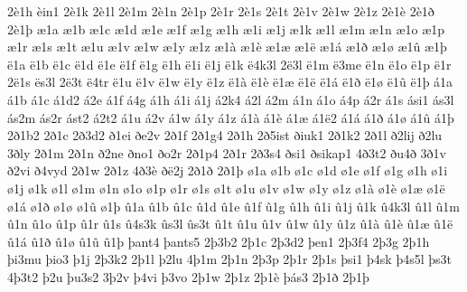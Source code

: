 {2^^e81h
^^e8in1
2^^e81k
2^^e81l
2^^e81m
2^^e81n
2^^e81p
2^^e81r
2^^e81s
2^^e81t
2^^e81v
2^^e81w
2^^e81z
2^^e81^^e8
2^^e81^^f0
2^^e81^^fe
^^e61a
^^e61b
^^e61c
^^e61d
^^e61e
^^e61f
^^e61g
^^e61h
^^e61i
^^e61j
^^e61k
^^e61l
^^e61m
^^e61n
^^e61o
^^e61p
^^e61r
^^e61s
^^e61t
^^e61u
^^e61v
^^e61w
^^e61y
^^e61z
^^e61^^e0
^^e61^^e8
^^e61^^e6
^^e61^^eb
^^e61^^e1
^^e61^^f0
^^e61^^f8
^^e61^^fb
^^e61^^fe
^^eb1a
^^eb1b
^^eb1c
^^eb1d
^^eb1e
^^eb1f
^^eb1g
^^eb1h
^^eb1i
^^eb1j
^^eb1k
^^eb4k3l
2^^eb3l
^^eb1m
^^eb3me
^^eb1n
^^eb1o
^^eb1p
^^eb1r
2^^eb1s
^^ebs3l
2^^eb3t
^^eb4tr
^^eb1u
^^eb1v
^^eb1w
^^eb1y
^^eb1z
^^eb1^^e0
^^eb1^^e8
^^eb1^^e6
^^eb1^^eb
^^eb1^^e1
^^eb1^^f0
^^eb1^^f8
^^eb1^^fb
^^eb1^^fe
^^e11a
^^e11b
^^e11c
^^e11d2
^^e12e
^^e11f
^^e14g
^^e11h
^^e11i
^^e11j
^^e12k4
^^e12l
^^e12m
^^e11n
^^e11o
^^e14p
^^e12r
^^e11s
^^e1si1
^^e1s3l
^^e1s2m
^^e1s2r
^^e1st2
^^e12t2
^^e11u
^^e12v
^^e11w
^^e11y
^^e11z
^^e11^^e0
^^e11^^e8
^^e11^^e6
^^e11^^eb2
^^e11^^e1
^^e11^^f0
^^e11^^f8
^^e11^^fb
^^e11^^fe
2^^f01b2
2^^f01c
2^^f03d2
^^f01ei
^^f0e2v
2^^f01f
2^^f01g4
2^^f01h
2^^f05ist
^^f0iuk1
2^^f01k2
2^^f01l
^^f02lij
^^f02lu
3^^f0ly
2^^f01m
2^^f01n
^^f02ne
^^f0no1
^^f0o2r
2^^f01p4
2^^f01r
2^^f03s4
^^f0si1
^^f0sikap1
4^^f03t2
^^f0u4^^f0
3^^f01v
^^f02vi
^^f04vyd
2^^f01w
2^^f01z
4^^f03^^e8
^^f0^^eb2j
2^^f01^^f0
2^^f01^^fe
^^f81a
^^f81b
^^f81c
^^f81d
^^f81e
^^f81f
^^f81g
^^f81h
^^f81i
^^f81j
^^f81k
^^f81l
^^f81m
^^f81n
^^f81o
^^f81p
^^f81r
^^f81s
^^f81t
^^f81u
^^f81v
^^f81w
^^f81y
^^f81z
^^f81^^e0
^^f81^^e8
^^f81^^e6
^^f81^^eb
^^f81^^e1
^^f81^^f0
^^f81^^f8
^^f81^^fb
^^f81^^fe
^^fb1a
^^fb1b
^^fb1c
^^fb1d
^^fb1e
^^fb1f
^^fb1g
^^fb1h
^^fb1i
^^fb1j
^^fb1k
^^fb4k3l
^^fb1l
^^fb1m
^^fb1n
^^fb1o
^^fb1p
^^fb1r
^^fb1s
^^fb4s3k
^^fbs3l
^^fbs3t
^^fb1t
^^fb1u
^^fb1v
^^fb1w
^^fb1y
^^fb1z
^^fb1^^e0
^^fb1^^e8
^^fb1^^e6
^^fb1^^eb
^^fb1^^e1
^^fb1^^f0
^^fb1^^f8
^^fb1^^fb
^^fb1^^fe
^^feant4
^^feants5
2^^fe3b2
2^^fe1c
2^^fe3d2
^^feen1
2^^fe3f4
2^^fe3g
2^^fe1h
^^fei3mu
^^feio3
^^fe1j
2^^fe3k2
2^^fe1l
^^fe2lu
4^^fe1m
2^^fe1n
2^^fe3p
2^^fe1r
2^^fe1s
^^fesi1
^^fe4sk
^^fe4s5l
^^fes3t
4^^fe3t2
^^fe2u
^^feu3s2
3^^fe2v
^^fe4vi
^^fe3vo
2^^fe1w
2^^fe1z
2^^fe1^^e8
^^fe^^e1s3
2^^fe1^^f0
2^^fe1^^fe
}
\endgroup
